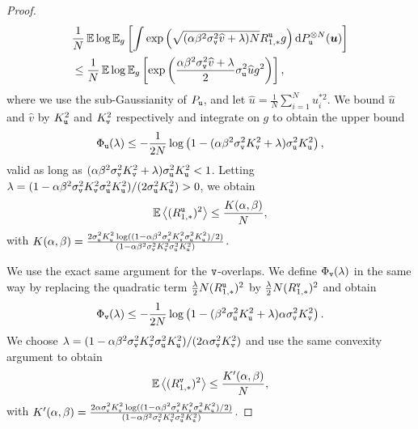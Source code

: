 \documentclass[final,12pt]{colt2018} %
\newcommand{\utt}{\textup{\texttt{u}}}
\newcommand{\vtt}{\textup{\texttt{v}}}
\renewcommand{\u}{\bm{u}}
\begin{document}
\begin{proof}
\begin{align*}
&\frac{1}{N}\E \log \E_g \left[\int \exp\left(\sqrt{(\alpha\beta^2\sigma_\vtt^2 \widehat{v}  + \lambda) N} R_{1,*}^{\utt}g\right) \rmd P_{\utt}^{\otimes N}(\u)\right]\\
&\le\frac{1}{N}\E \log \E_g  \left[\exp\left(\frac{\alpha\beta^2\sigma_\vtt^2 \widehat{v}  + \lambda}{2} \sigma_{\utt}^2 \widehat{u} g^2\right)\right],
\end{align*}
where we use the sub-Gaussianity of $P_{\utt}$, and let $\widehat{u} = \frac{1}{N}\sum_{i=1}^N u_i^{*2}$. We bound $\widehat{u}$ and $\widehat{v}$ by $K_{\utt}^2$ and $K_{\vtt}^2$ respectively and integrate on $g$ to obtain the upper bound
\begin{equation*}
\Phi_{\utt}(\lambda) \le -\frac{1}{2N} \log \left(1 - (\alpha\beta^2\sigma_\vtt^2 K_{\vtt}^2  + \lambda)\sigma_{\utt}^2 K_{\utt}^2\right),
\end{equation*}
valid as long as $(\alpha\beta^2\sigma_\vtt^2 K_{\vtt}^2  + \lambda)\sigma_{\utt}^2 K_{\utt}^2 <1$. Letting $\lambda = (1-\alpha\beta^2\sigma_\vtt^2 K_{\vtt}^2\sigma_{\utt}^2 K_{\utt}^2)/(2\sigma_{\utt}^2 K_{\utt}^2) >0$, we obtain
\[\E\left \langle (R^{\utt}_{1,*})^2\right \rangle \le \frac{K(\alpha,\beta)}{N},\]
with $K(\alpha,\beta) = \frac{2\sigma_{\utt}^2 K_{\utt}^2\log((1-\alpha\beta^2\sigma_\vtt^2 K_{\vtt}^2\sigma_{\utt}^2 K_{\utt}^2)/2)}{(1-\alpha\beta^2\sigma_\vtt^2 K_{\vtt}^2\sigma_{\utt}^2 K_{\utt}^2)}$.

We use the exact same argument for the $\vtt$-overlaps. We define $\Phi_\vtt(\lambda)$ in the same way by replacing the quadratic term $\frac{\lambda}{2}N (R^\utt_{1,*})^2$ by $\frac{\lambda}{2}N(R^\vtt_{1,*})^2$ and obtain
\[\Phi_\vtt(\lambda) \le -\frac{1}{2N} \log \left(1 - (\beta^2\sigma_\utt^2 K_{\utt}^2  + \lambda)\alpha\sigma_{\vtt}^2 K_{\vtt}^2\right).\]
We choose $\lambda = (1-\alpha\beta^2\sigma_\vtt^2 K_{\vtt}^2\sigma_{\utt}^2 K_{\utt}^2)/(2\alpha\sigma_{\vtt}^2 K_{\vtt}^2)$ and use the same convexity argument to obtain
\[\E\left \langle (R^{\vtt}_{1,*})^2\right \rangle \le \frac{K'(\alpha,\beta)}{N},\]
with $K'(\alpha,\beta) = \frac{2\alpha\sigma_{\vtt}^2 K_{\vtt}^2\log((1-\alpha\beta^2\sigma_\vtt^2 K_{\vtt}^2\sigma_{\utt}^2 K_{\utt}^2)/2)}{(1-\alpha\beta^2\sigma_\vtt^2 K_{\vtt}^2\sigma_{\utt}^2 K_{\utt}^2)}$.
\end{proof}
\end{document}

